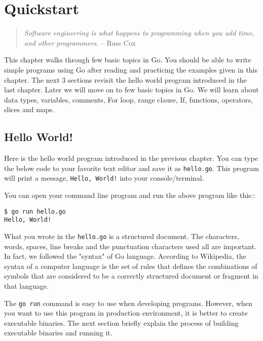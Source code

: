 \cleardoublepage
{}
\chapter{Quickstart}

\begin{quote}
\textit{Software engineering is what happens to programming when you add time,
and other programmers.} -- Russ Cox
\end{quote}

This chapter walks through few basic topics in Go.  You should be able
to write simple programs using Go after reading and practicing the
examples given in this chapter.  The next 3 sections revisit the hello
world program introduced in the last chapter.  Later we will move on
to few basic topics in Go.  We will learn about data types, variables,
comments, For loop, range clause, If, functions, operators, slices and
maps.

\section{Hello World!}

Here is the hello world program introduced in the previous chapter.
You can type the below code to your favorite text editor and save it
as \texttt{hello.go}.  This program will print a
message, \texttt{Hello, World!} into your console/terminal.



You can open your command line program and run the above program like
this::

\begin{lstlisting}[numbers=none]
$ go run hello.go
Hello, World!
\end{lstlisting}

What you wrote in the \texttt{hello.go} is a structured document.  The
characters, words, spaces, line breaks and the punctuation characters
used all are important.  In fact, we followed the "syntax" of Go
language.  According to Wikipedia, the syntax of a computer language
is the set of rules that defines the combinations of symbols that are
considered to be a correctly structured document or fragment in that
language.

The \texttt{go run} command is easy to use when developing programs.
However, when you want to use this program in production environment,
it is better to create executable binaries.  The next section briefly
explain the process of building executable binaries and running it.

